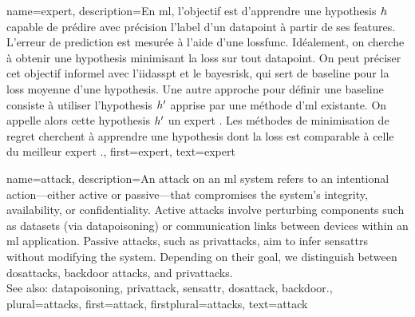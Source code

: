 {
	name={expert},
	description={En \gls{ml}, l'objectif est d'apprendre une \gls{hypothesis} $h$ capable de prédire avec précision l'\gls{label} 
		d'un \gls{datapoint} à partir de ses \glspl{feature}. L'erreur de \gls{prediction} est mesurée à l'aide d'une \gls{lossfunc}. 
		Idéalement, on cherche à obtenir une \gls{hypothesis} minimisant la \gls{loss} sur tout \gls{datapoint}. 
		On peut préciser cet objectif informel avec l'\gls{iidasspt} et le \gls{bayesrisk}, qui sert de \gls{baseline} pour la \gls{loss} moyenne d'une \gls{hypothesis}. 
		Une autre approche pour définir une \gls{baseline} consiste à utiliser l'\gls{hypothesis} $h'$ apprise par une méthode d’\gls{ml} existante. 
		On appelle alors cette \gls{hypothesis} $h'$ un expert \cite{PredictionLearningGames}. 
		Les méthodes de minimisation de \gls{regret} cherchent à apprendre une \gls{hypothesis} dont la \gls{loss} est comparable à celle du meilleur expert \cite{PredictionLearningGames,HazanOCO}.},
	first={expert},
	text={expert}
}


{name={attack},  
	description={An attack on an \gls{ml} system refers to an intentional action—either 
		active or passive—that compromises the system's integrity, availability, or confidentiality. 
		Active attacks involve perturbing components such as \glspl{dataset} (via \gls{datapoisoning}) 
		or communication links between \glspl{device} within an \gls{ml} application. Passive attacks, 
		such as \glspl{privattack}, aim to infer \glspl{sensattr} without modifying the system. 
		Depending on their goal, we distinguish between \glspl{dosattack}, \gls{backdoor} attacks, and \glspl{privattack}.
		\\
		See also: \gls{datapoisoning}, \gls{privattack}, \gls{sensattr}, \gls{dosattack}, \gls{backdoor}.},
	plural={attacks}, 
	first={attack},
	firstplural={attacks},
	text={attack}
}

